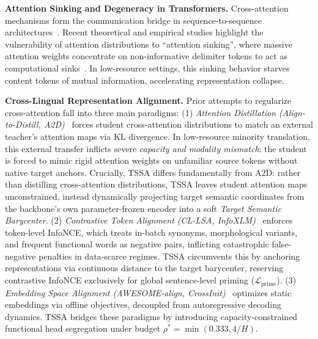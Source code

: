 \documentclass[11pt]{article}
\begin{document}
\smallskip
\noindent\textbf{Attention Sinking and Degeneracy in Transformers.}\quad
Cross-attention mechanisms form the communication bridge in sequence-to-sequence architectures~\cite{vaswani2017attention,bahdanau2015neural}. Recent theoretical and empirical studies highlight the vulnerability of attention distributions to ``attention sinking'', where massive attention weights concentrate on non-informative delimiter tokens to act as computational sinks~\cite{chen2020accurate}. In low-resource settings, this sinking behavior starves content tokens of mutual information, accelerating representation collapse.

\smallskip
\noindent\textbf{Cross-Lingual Representation Alignment.}\quad
Prior attempts to regularize cross-attention fall into three main paradigms:
(1) \textit{Attention Distillation (Align-to-Distill, A2D)}~\cite{jin2024align} forces student cross-attention distributions to match an external teacher's attention maps via KL divergence. In low-resource minority translation, this external transfer inflicts severe \textit{capacity and modality mismatch}: the student is forced to mimic rigid attention weights on unfamiliar source tokens without native target anchors. Crucially, TSSA differs fundamentally from A2D: rather than distilling cross-attention distributions, TSSA leaves student attention maps unconstrained, instead dynamically projecting target semantic coordinates from the backbone's own parameter-frozen encoder into a soft \textit{Target Semantic Barycenter}.
(2) \textit{Contrastive Token Alignment (CL-LSA, InfoXLM)}~\cite{chi2021infoxlm} enforces token-level InfoNCE, which treats in-batch synonyms, morphological variants, and frequent functional words as negative pairs, inflicting catastrophic false-negative penalties in data-scarce regimes. TSSA circumvents this by anchoring representations via continuous distance to the target barycenter, reserving contrastive InfoNCE exclusively for global sentence-level priming ($\mathcal{L}_{\text{prime}}$).
(3) \textit{Embedding Space Alignment (AWESOME-align, CrossInit)}~\cite{dou2021word,ai2024zero} optimizes static embeddings via offline objectives, decoupled from autoregressive decoding dynamics. TSSA bridges these paradigms by introducing capacity-constrained functional head segregation under budget $\rho^* = \min(0.333, 4/H)$.
\end{document}
